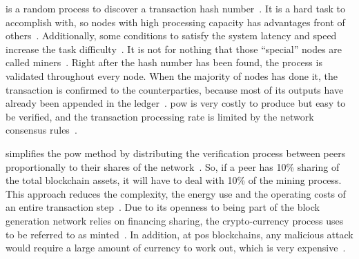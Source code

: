 \begin{description}[font={\normalfont\bfseries}]
    \item[\glsitem{pow}] is a random process to discover a transaction hash number~\cite{pwc2016, xu2016}.
    It is a hard task to accomplish with, so nodes with high processing capacity has advantages front of others~\cite{xu2016}.
    Additionally, some conditions to satisfy the system latency and speed increase the task difficulty~\cite{pwc2016}.
    It is not for nothing that those ``special'' nodes are called miners~\cite{itu2017}.
    Right after the hash number has been found, the process is validated throughout every node.
    When the majority of nodes has done it, the transaction is confirmed to the counterparties, because most of its outputs have already been appended in the ledger~\cite{pwc2016}.
    \gls{pow} is very costly to produce but easy to be verified, and the transaction processing rate is limited by the network consensus rules~\cite{xu2016}.
    
    \item[\glsitem{pos}] simplifies the \gls{pow} method by distributing the verification process between peers proportionally to their shares of the network~\cite{pwc2016}.
    So, if a peer has 10\% sharing of the total blockchain assets, it will have to deal with 10\% of the mining process.
    This approach reduces the complexity, the energy use and the operating costs of an entire transaction step~\cite{itu2017}.
    Due to its openness to being part of the block generation network relies on financing sharing, the crypto-currency process uses to be referred to as minted~\cite{itu2017}.
    In addition, at \gls{pos} blockchains, any malicious attack would require a large amount of currency to work out, which is very expensive~\cite{xu2016}.
    
    

\end{description}
